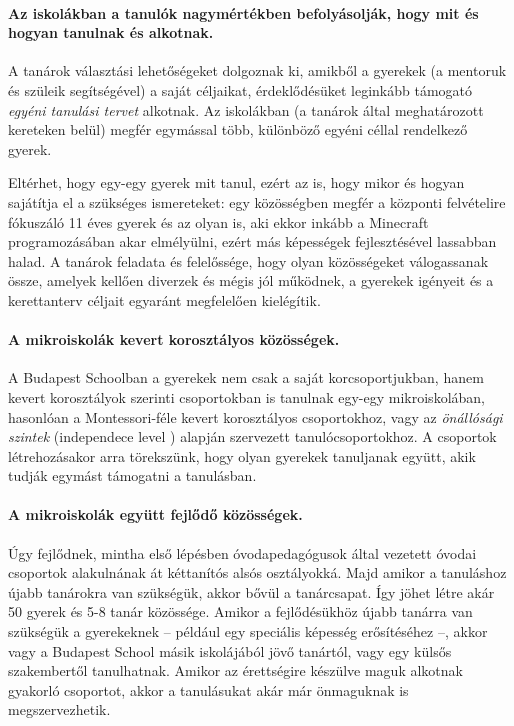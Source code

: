   \paragraph{Az iskolákban a tanulók nagymértékben befolyásolják, hogy mit és hogyan tanulnak és alkotnak.}

    A tanárok választási lehetőségeket dolgoznak ki, amikből a gyerekek (a
    mentoruk és szüleik segítségével) a saját céljaikat, érdeklődésüket leginkább
    támogató \emph{egyéni tanulási tervet} alkotnak. Az iskolákban (a tanárok által
    meghatározott kereteken belül) megfér egymással több, különböző egyéni céllal
    rendelkező gyerek.

    Eltérhet, hogy egy-egy gyerek mit tanul, ezért az is, hogy mikor és hogyan
    sajátítja el a szükséges ismereteket: egy közösségben megfér a központi
    felvételire fókuszáló 11 éves gyerek és az olyan is, aki ekkor inkább a
    Mine\-craft programozásában akar elmélyülni, ezért más képességek fejlesztésével
    lassabban halad. A tanárok feladata és felelőssége, hogy olyan közösségeket
    válogassanak össze, amelyek kellően diverzek és mégis jól működnek, a gyerekek
    igényeit és a kerettanterv céljait egyaránt megfelelően kielégítik.

  \paragraph{A mikroiskolák kevert korosztályos közösségek.}

    A Budapest Schoolban a gyerekek nem csak a saját korcsoportjukban, hanem kevert korosztályok szerinti csoportokban is tanulnak egy-egy mikroiskolában, hasonlóan a Montessori-féle kevert korosztályos csoportokhoz, vagy az \emph{önállósági szintek} (independece level \cite{indepence_level}) alapján szervezett tanulócsoportokhoz. A csoportok létrehozásakor arra törekszünk, hogy olyan gyerekek tanuljanak együtt, akik tudják egymást támogatni a tanulásban.

  \paragraph{A mikroiskolák együtt fejlődő közösségek.}

    Úgy fejlődnek, mintha első lépésben óvodapedagógusok által vezetett óvodai csoportok
    alakulnának át kéttanítós alsós osztályokká. Majd amikor a tanuláshoz újabb
    tanárokra van szükségük, akkor bővül a tanárcsapat. Így jöhet létre akár 50 gyerek és 5-8
    tanár közössége. Amikor a fejlődésükhöz újabb tanárra van szükségük a
    gyerekeknek -- például egy speciális képesség erősítéséhez --, akkor vagy a
    Budapest School másik iskolájából jövő tanártól, vagy egy külsős szakembertől
    tanulhatnak. Amikor az érettségire készülve maguk alkotnak gyakorló csoportot, akkor a tanulásukat akár már önmaguknak is megszervezhetik.

